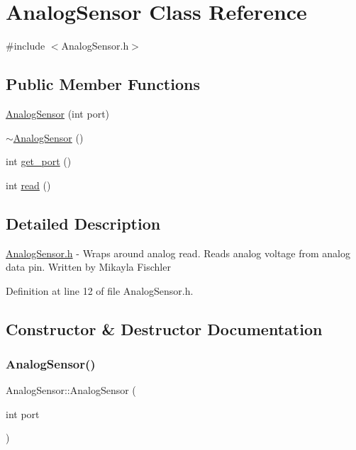 \hypertarget{class_analog_sensor}{}\section{Analog\+Sensor Class Reference}
\label{class_analog_sensor}


{\ttfamily \#include $<$Analog\+Sensor.\+h$>$}

\subsection*{Public Member Functions}
\begin{DoxyCompactItemize}
\item 
\hyperlink{class_analog_sensor_a7dddc72b8ea46fc16ade59286962dff0}{Analog\+Sensor} (int port)
\item 
\hyperlink{class_analog_sensor_a4b88bf9ee03c180dedea7822e5d32997}{$\sim$\+Analog\+Sensor} ()
\item 
int \hyperlink{class_analog_sensor_ac1b3abc06cdff820a1c0e56ba064495e}{get\+\_\+port} ()
\item 
int \hyperlink{class_analog_sensor_a4672ca490072cb436dfa37fe1e6c6a0a}{read} ()
\end{DoxyCompactItemize}


\subsection{Detailed Description}
\hyperlink{_analog_sensor_8h}{Analog\+Sensor.\+h} -\/ Wraps around analog read. Reads analog voltage from analog data pin. Written by Mikayla Fischler 

Definition at line 12 of file Analog\+Sensor.\+h.



\subsection{Constructor \& Destructor Documentation}
\mbox{\label{class_analog_sensor_a7dddc72b8ea46fc16ade59286962dff0}} 
\subsubsection{\texorpdfstring{Analog\+Sensor()}{AnalogSensor()}}
{\footnotesize\ttfamily Analog\+Sensor\+::\+Analog\+Sensor (\begin{DoxyParamCaption}\item[{int}]{port }\end{DoxyParamCaption})}

